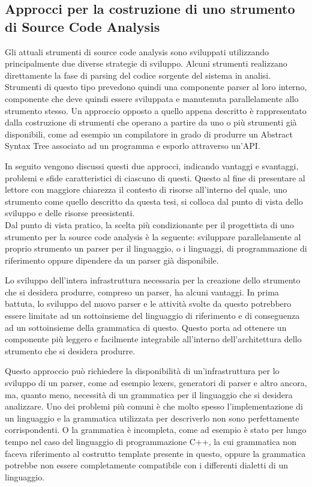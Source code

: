 \subsection{Approcci per la costruzione di uno strumento di Source Code
Analysis}
\label{sca-approches}

Gli attuali strumenti di source code analysis sono sviluppati utilizzando
principalmente due diverse strategie di sviluppo. Alcuni strumenti realizzano
direttamente la fase di parsing del codice sorgente del sistema in analisi.
Strumenti di questo tipo prevedono quindi una componente parser al loro interno,
componente che deve quindi essere sviluppata e manutenuta parallelamente allo
strumento stesso. Un approccio opposto a quello appena descritto è rappresentato
dalla costruzione di strumenti che operano a partire da uno o più strumenti già
disponibili, come ad esempio un compilatore in grado di produrre un Abstract
Syntax Tree associato ad un programma e esporlo attraverso un’API.

In seguito vengono discussi questi due approcci, indicando vantaggi e
svantaggi, problemi e sfide caratteristici di ciascuno di questi. Questo al
fine di presentare al lettore con maggiore chiarezza il contesto di risorse
all’interno del quale, uno strumento come quello descritto da questa tesi, si
colloca dal punto di vista dello sviluppo e delle risorse preesistenti.\\

Dal punto di vista pratico, la scelta più condizionante per il progettista di
uno strumento per la source code analysis è la seguente: sviluppare
parallelamente al proprio strumento un parser per il linguaggio, o i linguaggi,
di programmazione di riferimento oppure dipendere da un parser già disponibile.

Lo sviluppo dell’intera infrastruttura necessaria per la creazione dello
strumento che si desidera produrre, compreso un parser, ha alcuni vantaggi. In
prima battuta, lo sviluppo del nuovo parser e le attività svolte da questo
potrebbero essere limitate ad un sottoinsieme del linguaggio di riferimento e di
conseguenza ad un sottoinsieme della grammatica di questo. Questo porta ad
ottenere un componente più leggero e facilmente integrabile all'interno
dell'architettura dello strumento che si desidera produrre.

Questo approccio può richiedere la disponibilità di un’infrastruttura per lo
sviluppo di un parser, come ad esempio lexers, generatori di parser e altro
ancora, ma, quanto meno, necessità di un grammatica per il linguaggio che si
desidera analizzare. Uno dei problemi più comuni è che molto spesso
l’implementazione di un linguaggio e la grammatica utilizzata per descriverlo
non sono perfettamente corrispondenti. O la grammatica è incompleta, come ad
esempio è stato per lungo tempo nel caso del linguaggio di programmazione C++,
la cui grammatica non faceva riferimento al costrutto template presente in
questo, oppure la grammatica potrebbe non essere completamente compatibile con i
differenti dialetti di un linguaggio.

